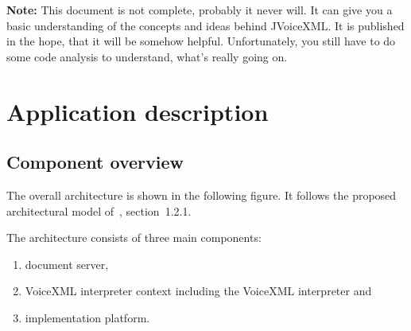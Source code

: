 \documentclass[11pt,a4paper]{article}
\begin{document}
\textbf{Note: } This document is not complete, probably it never will. It can
give you a basic understanding of the concepts and ideas behind JVoiceXML. It
is published in the hope, that it will be somehow helpful.
Unfortunately, you still have to do some code analysis to understand, what's
really going on.

\section{Application description}
\label{sec:appl-descr}

\subsection{Component overview}
\label{sec:component-overview}

The overall architecture is shown in the following figure.
It follows the proposed architectural model of~\cite{w3.org:voicexml}, 
section~1.2.1. 
\begin{center}
\end{center}

The architecture consists of three main components:
\begin{enumerate}
\item document server,
\item VoiceXML interpreter context including the VoiceXML interpreter and
\item implementation platform.
\end{enumerate}
\end{document}
